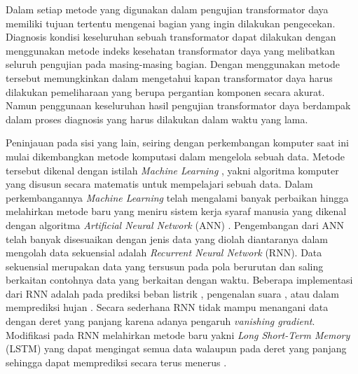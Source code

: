Dalam setiap metode yang digunakan dalam pengujian transformator daya memiliki tujuan tertentu mengenai bagian yang ingin dilakukan pengecekan. Diagnosis kondisi keseluruhan sebuah transformator dapat dilakukan dengan menggunakan metode indeks kesehatan transformator daya yang melibatkan seluruh pengujian pada masing-masing bagian\cite{jahromi2009approach}. Dengan menggunakan metode tersebut memungkinkan dalam mengetahui kapan transformator daya harus dilakukan pemeliharaan yang berupa pergantian komponen secara akurat. Namun penggunaan keseluruhan hasil pengujian transformator daya berdampak dalam proses diagnosis yang harus dilakukan dalam waktu yang lama. 

Peninjauan pada sisi yang lain, seiring dengan perkembangan komputer saat ini mulai dikembangkan metode komputasi dalam mengelola sebuah data. Metode tersebut dikenal dengan istilah \textit{Machine Learning} \cite{jordan2015machine}, yakni algoritma komputer yang disusun secara matematis untuk mempelajari sebuah data. Dalam perkembangannya \textit{Machine Learning} telah mengalami banyak perbaikan hingga melahirkan metode baru yang meniru sistem kerja syaraf manusia yang dikenal dengan algoritma \textit{Artificial Neural Network} (ANN) \cite{braspenning1995artificial}. Pengembangan dari ANN telah banyak disesuaikan dengan jenis data yang diolah diantaranya dalam mengolah data sekuensial adalah \textit{Recurrent Neural Network} (RNN). Data sekuensial merupakan data yang tersusun pada pola berurutan dan saling berkaitan contohnya data yang berkaitan dengan waktu. Beberapa implementasi dari RNN adalah pada prediksi beban listrik \cite{tokgoz2018rnn, tang2019application, deihimi2012application}, pengenalan suara \cite{miao2015eesen, amberkar2018speech}, atau dalam memprediksi hujan \cite{habi2019rnn}. Secara sederhana RNN tidak mampu menangani data dengan deret yang panjang karena adanya pengaruh \textit{vanishing gradient}. Modifikasi pada RNN melahirkan metode baru yakni \textit{Long Short-Term Memory} (LSTM) yang dapat mengingat semua data walaupun pada deret yang panjang sehingga dapat memprediksi secara terus menerus \cite{gers1999learning}. \par 

